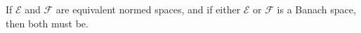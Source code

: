 If $\mathcal{E}$ and $\mathcal{F}$ are equivalent normed spaces, and if either $\mathcal{E}$ or $\mathcal{F}$ is a Banach space, then both must be.
